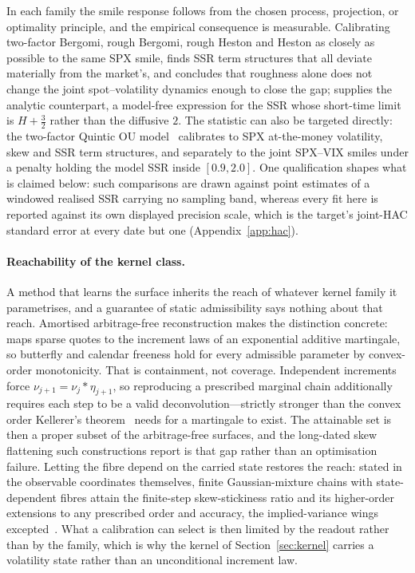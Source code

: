 \documentclass[11pt]{article}
\providecommand{\1}{\mathbf 1}
\begin{document}
In each family the smile response follows from the chosen process, projection, or optimality
principle, and the empirical consequence is measurable. Calibrating two-factor Bergomi, rough
Bergomi, rough Heston and Heston as closely as possible to the same SPX smile, \cite{bourgey2024}
finds SSR term structures that all deviate materially from the market's, and concludes that
roughness alone does not change the joint spot--volatility dynamics enough to close the gap;
\cite{frizgatheral2024} supplies the analytic counterpart, a model-free expression for the SSR whose
short-time limit is $H+\tfrac32$ rather than the diffusive $2$. The statistic can also be targeted
directly: the two-factor Quintic OU model~\cite{abijaber2025} calibrates to SPX at-the-money
volatility, skew and SSR term structures, and separately to the joint SPX--VIX smiles under a
penalty holding the model SSR inside $[0.9,2.0]$. One qualification shapes what is claimed below:
such comparisons are drawn against point estimates of a windowed realised SSR carrying no sampling
band, whereas every fit here is reported against its own displayed precision scale, which is the
target's joint-HAC standard error at every date but one (Appendix~\ref{app:hac}).

\paragraph{Reachability of the kernel class.} A method that learns the surface inherits the reach of
whatever kernel family it parametrises, and a guarantee of static admissibility says nothing about
that reach. Amortised arbitrage-free reconstruction makes the distinction concrete:
\cite{luo2026addmart} maps sparse quotes to the increment laws of an exponential additive
martingale, so butterfly and calendar freeness hold for every admissible parameter by convex-order
monotonicity. That is containment, not coverage. Independent increments force
$\nu_{j+1}=\nu_j*\eta_{j+1}$, so reproducing a prescribed marginal chain additionally requires each
step to be a valid deconvolution---strictly stronger than the convex order Kellerer's
theorem~\cite{kellerer1972} needs for a martingale to exist. The attainable set is then a proper
subset of the arbitrage-free surfaces, and the long-dated skew flattening such constructions report
is that gap rather than an optimisation failure. Letting the fibre depend on the carried state
restores the reach: stated in the observable coordinates themselves, finite Gaussian-mixture chains
with state-dependent fibres attain the finite-step skew-stickiness ratio and its higher-order
extensions to any prescribed order and accuracy, the implied-variance wings
excepted~\cite{caohuang2026gm}. What a calibration can select is then limited by the readout rather
than by the family, which is why the kernel of Section~\ref{sec:kernel} carries a volatility state
rather than an unconditional increment law.
\end{document}

